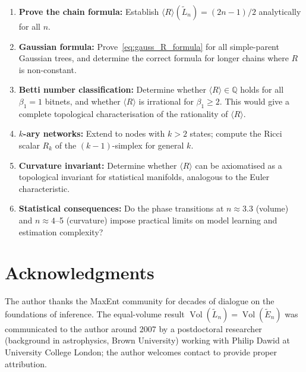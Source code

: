 \documentclass[11pt]{article}
\theoremstyle{definition}
\DeclareMathOperator{\Vol}{Vol}
\begin{document}
\begin{enumerate}
\item \textbf{Prove the chain formula:} Establish 
  $\langle R\rangle(\tilde{L}_n) = (2n-1)/2$ analytically for all $n$.

\item \textbf{Gaussian formula:} Prove~\eqref{eq:gauss_R_formula} for 
  all simple-parent Gaussian trees, and determine the correct formula 
  for longer chains where $R$ is non-constant.

\item \textbf{Betti number classification:} Determine whether 
  $\langle R\rangle \in \mathbb{Q}$ holds for all $\beta_1 = 1$ bitnets, 
  and whether $\langle R\rangle$ is irrational for $\beta_1 \geq 2$.  
  This would give a complete topological characterisation of the 
  rationality of $\langle R\rangle$.

\item \textbf{$k$-ary networks:} Extend to nodes with $k > 2$ states; 
  compute the Ricci scalar $R_k$ of the $(k-1)$-simplex for general $k$.

\item \textbf{Curvature invariant:} Determine whether $\langle R\rangle$ 
  can be axiomatised as a topological invariant for statistical manifolds, 
  analogous to the Euler characteristic.

\item \textbf{Statistical consequences:} Do the phase transitions at 
  $n \approx 3.3$ (volume) and $n \approx 4$--5 (curvature) impose 
  practical limits on model learning and estimation complexity?
\end{enumerate}

\section*{Acknowledgments}

The author thanks the MaxEnt community for decades of dialogue on the 
foundations of inference.  The equal-volume result $\Vol(\tilde{L}_n) = 
\Vol(\tilde{E}_n)$ was communicated to the author around 2007 by a 
postdoctoral researcher (background in astrophysics, Brown University) 
working with Philip Dawid at University College London; the author 
welcomes contact to provide proper attribution.
\end{document}

